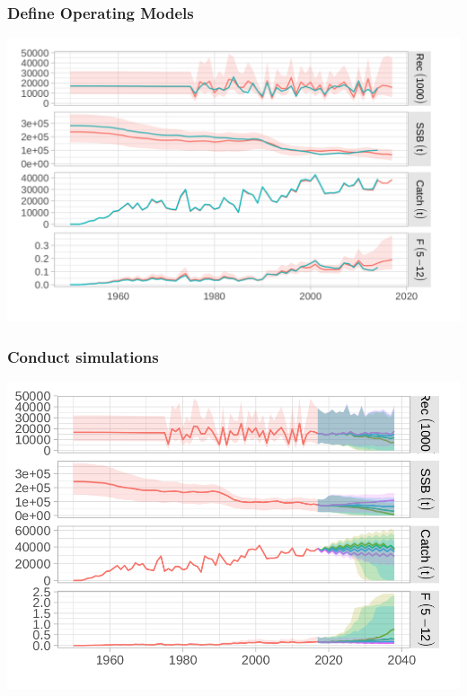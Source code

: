 \documentclass{beamer}
\begin{document}
\begin{frame}
\frametitle{Define Operating Models}

\centering
\includegraphics[height=0.8\textheight]{figs/om.png}

\end{frame}

\begin{frame}
\frametitle{Conduct simulations}

\centering
\includegraphics[height=0.8\textheight]{figs/runs.png}

\end{frame}
\end{document}
